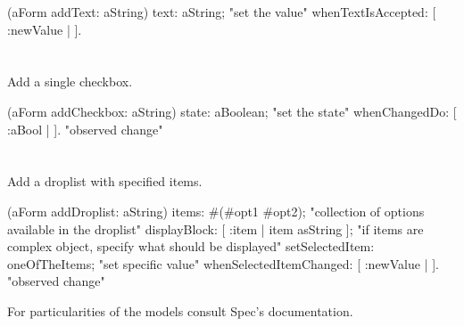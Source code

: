 \documentclass[a4paper,10pt,twoside]{book}
\begin{document}
\begin{code}{}
(aForm addText: aString)
	text: aString; "set the value"
	whenTextIsAccepted: [ :newValue | ].
\end{code}

\section{ }
Add a single checkbox.


\begin{code}{}
(aForm addCheckbox: aString)
	state: aBoolean; "set the state"
	whenChangedDo: [ :aBool | ]. "observed change"
\end{code}

\section{ }
Add a droplist with specified items.


\begin{code}{}
(aForm addDroplist: aString)
	items: #(#opt1 #opt2); "collection of options available in the droplist"
	displayBlock: [ :item | item asString ]; "if items are complex object, specify what should be displayed"
	setSelectedItem: oneOfTheItems; "set specific value"
	whenSelectedItemChanged: [ :newValue | ]. "observed change"
\end{code}


For particularities of the models consult Spec's documentation.



\ifx\wholebook\relax\else
   
\end{document}
